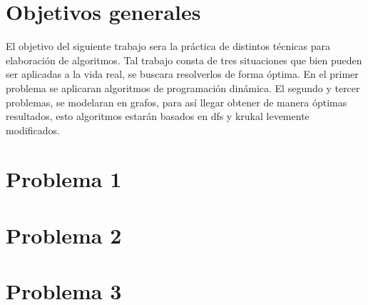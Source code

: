 \documentclass[a4paper]{article}
\begin{document}
\thispagestyle{empty}

\maketitle
\newpage

\thispagestyle{empty}
\vfill

\thispagestyle{empty}
\vspace{1.5cm}
\tableofcontents
\newpage


\newpage
\section{Objetivos generales}
\setcounter{page}{1}

El objetivo del siguiente trabajo sera la práctica de distintos técnicas para elaboración de algoritmos.
Tal trabajo consta de tres situaciones que bien pueden ser aplicadas a la vida real, se buscara resolverlos de forma óptima. \newline
En el primer problema se aplicaran algoritmos de programación dinámica. El segundo y tercer problemas, se modelaran en grafos, para así llegar obtener de manera óptimas resultados, esto algoritmos estarán basados en dfs y krukal levemente modificados.  



\section{Problema 1}


\newpage
\section{Problema 2}


\newpage
\section{Problema 3}

\end{document}
